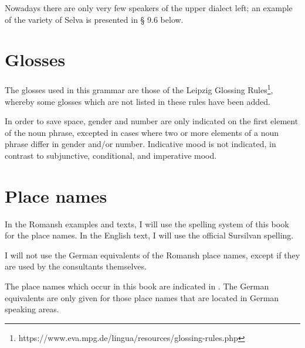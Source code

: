 Nowadays there are only very few speakers of the upper dialect left; an example of the variety of Selva is presented in § 9.6 below.


\section{Glosses}
The glosses used in this grammar are those of the Leipzig Glossing Rules\footnote{https://www.eva.mpg.de/lingua/resources/glossing-rules.php}, whereby some glosses which are not listed in these rules have been added.

In order to save space, gender and number are only indicated on the first element of the noun phrase, excepted in cases where two or more elements of a noun phrase differ in gender and/or number. Indicative mood is not indicated, in contrast to subjunctive, conditional, and imperative mood.

\section{Place names}
In the Romansh examples and texts, I will use the spelling system of this book for the place names. In the English text, I will use the official Sursilvan spelling.

I will not use the German equivalents of the Romansh place names, except if they are used by the consultants themselves.

The place names which occur in this book are indicated in . The German equivalents are only given for those place names that are located in German speaking areas.

